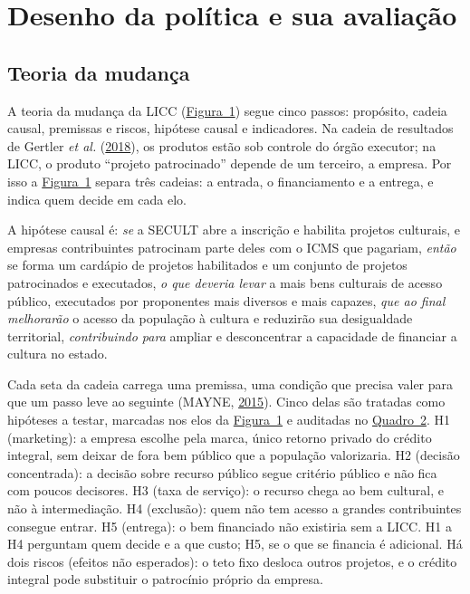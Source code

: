 \documentclass[12pt,a4paper]{article}
\begin{document}
\section{Desenho da política e sua avaliação}\label{secao-4}

\subsection{Teoria da mudança}\label{secao-4.1}

A teoria da mudança da LICC (\hyperref[figura-1]{Figura~1}) segue cinco passos: propósito, cadeia causal, premissas e
riscos, hipótese causal e indicadores. Na cadeia de resultados de Gertler \emph{et al.}
(\hyperref[ref-gertler-20]{2018}), os produtos estão sob controle do órgão executor; na LICC, o
produto ``projeto patrocinado'' depende de um terceiro, a empresa. Por isso a \hyperref[figura-1]{Figura~1} separa três
cadeias: a entrada, o financiamento e a entrega, e indica quem decide em cada elo.

A hipótese causal é: \emph{se} a SECULT abre a inscrição e habilita projetos culturais, e empresas
contribuintes patrocinam parte deles com o ICMS que pagariam, \emph{então} se forma um cardápio de
projetos habilitados e um conjunto de projetos patrocinados e executados, \emph{o que deveria levar}
a mais bens culturais de acesso público, executados por proponentes mais diversos e mais capazes,
\emph{que ao final melhorarão} o acesso da população à cultura e reduzirão sua desigualdade
territorial, \emph{contribuindo para} ampliar e desconcentrar a capacidade de financiar a cultura no
estado.

Cada seta da cadeia carrega uma premissa, uma condição que precisa valer para que um passo leve ao
seguinte (MAYNE, \hyperref[ref-mayne-25]{2015}). Cinco delas são tratadas como hipóteses a testar,
marcadas nos elos da \hyperref[figura-1]{Figura~1} e auditadas no \hyperref[quadro-2]{Quadro~2}. H1 (marketing): a empresa escolhe pela marca,
único retorno privado do crédito integral, sem deixar de fora bem público que a população
valorizaria. H2 (decisão concentrada): a decisão sobre recurso público segue critério público e não
fica com poucos decisores. H3 (taxa de serviço): o recurso chega ao bem cultural, e não à
intermediação. H4 (exclusão): quem não tem acesso a grandes contribuintes consegue entrar. H5
(entrega): o bem financiado não existiria sem a LICC. H1 a H4 perguntam quem decide e a que custo;
H5, se o que se financia é adicional. Há dois riscos (efeitos não esperados): o teto fixo desloca
outros projetos, e o crédito integral pode substituir o patrocínio próprio da empresa.
\end{document}
